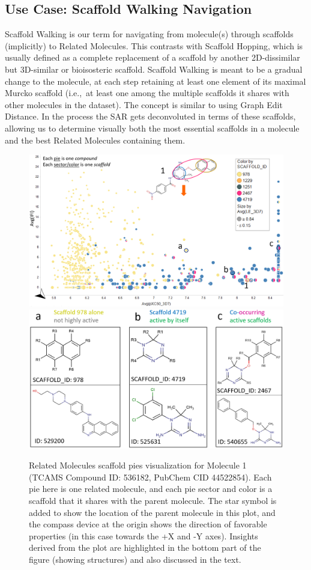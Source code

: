 \documentclass[journal=jacsat,biochem,manuscript=article]{achemso}
\newcommand*\ie{i.e.,~}
\begin{document}
\subsection{Use Case: Scaffold Walking Navigation}
\label{sec:scafwalk}
Scaffold Walking is our term for navigating from molecule(s) through scaffolds (implicitly) to Related Molecules. This contrasts with Scaffold Hopping, which is usually defined as a complete replacement of a scaffold by another 2D-dissimilar but 3D-similar or bioisosteric scaffold. Scaffold Walking is meant to be a gradual change to the molecule, at each step retaining at least one element of its maximal Murcko scaffold (\ie at least one among the multiple scaffolds it shares with other molecules in the dataset). The concept is similar to using Graph Edit Distance\cite{GH2019GED}. In the process the SAR gets deconvoluted in terms of these scaffolds, allowing us to determine visually both the most essential scaffolds in a molecule and the best Related Molecules containing them.       
\begin{figure}
  \includegraphics[width=6in]{fig/mol1_RGtool_scafpie_top_v4.png}
  \includegraphics[width=6in]{fig/mol1_RGtool_scafpie_struc_v4.png}
\caption{Related Molecules scaffold pies visualization for Molecule 1 (TCAMS Compound ID: 536182, PubChem CID 44522854). Each pie here is one related molecule, and each pie sector and color is a scaffold that it shares with the parent molecule. The star symbol is added to show the location of the parent molecule in this plot, and the compass device at the origin shows the direction of favorable properties (in this case towards the +X and -Y axes). Insights derived from the plot are highlighted in the bottom part of the figure (showing structures) and also discussed in the text.}
\label{fig:scafwalk1}
\end{figure}
\end{document}
